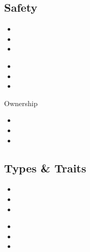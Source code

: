 \documentclass[50pt]{beamer}
\begin{document}
\subsection{Safety}

\begin{frame}
    \begin{itemize}
        \item
        \item
        \item
    \end{itemize}
\end{frame}


\begin{frame}
    \begin{itemize}
        \item
        \item
        \item
    \end{itemize}
\end{frame}

\begin{frame}
    Ownership
    \begin{itemize}
        \item
        \item
        \item
    \end{itemize}
\end{frame}

\subsection{Types \& Traits}

\begin{frame}
    \begin{itemize}
        \item
        \item
        \item
    \end{itemize}
\end{frame}


\begin{frame}
    \begin{itemize}
        \item
        \item
        \item
    \end{itemize}
\end{frame}
\end{document}
